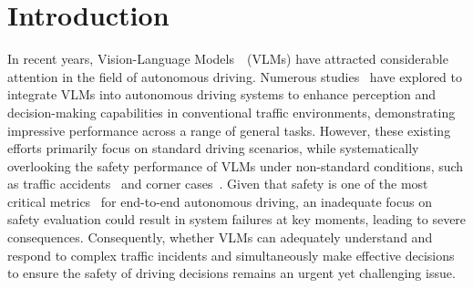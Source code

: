 \documentclass[sigconf]{acmart}
\begin{document}




\maketitle



\section{Introduction}

In recent years, Vision-Language Models~\cite{liu2023visual,qwen2vl2024,yu2024rlaif}~(VLMs) have attracted considerable attention in the field of autonomous driving. Numerous studies~\cite{sima2025drivelm,mao2024language,malla2023drama} have explored to integrate VLMs into autonomous driving systems to enhance perception and decision-making capabilities in conventional traffic environments, demonstrating impressive performance across a range of general tasks. However, these existing efforts primarily focus on standard driving scenarios, while systematically overlooking the safety performance of VLMs under non-standard conditions, such as traffic accidents~\cite{zheng2023avoid} and corner cases~\cite{breitenstein2021corner}. Given that safety is one of the most critical metrics~\cite{WHO2023RoadSafety} for end-to-end autonomous driving, an inadequate focus on safety evaluation could result in system failures at key moments, leading to severe consequences. Consequently, whether VLMs can adequately understand and respond to complex traffic incidents and simultaneously make effective decisions to ensure the safety of driving decisions remains an urgent yet challenging issue.
\end{document}
